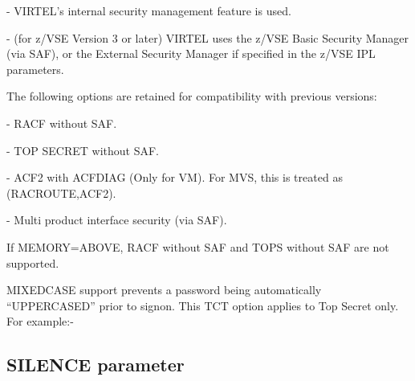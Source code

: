 \documentclass[letterpaper,10pt,english]{sphinxmanual}
\begin{document}
 - VIRTEL’s internal security management feature is used.

 - (for z/VSE Version 3 or later) VIRTEL uses the z/VSE Basic Security Manager (via SAF), or the External Security Manager if specified in the z/VSE IPL parameters.

The following options are retained for compatibility with previous versions:

 - RACF without SAF.

 - TOP SECRET without SAF.

 - ACF2 with ACFDIAG (Only for VM). For MVS, this is treated as (RACROUTE,ACF2).

 - Multi product interface security (via SAF).

If MEMORY=ABOVE, RACF without SAF and TOPS without SAF are not supported.

\newpage

MIXEDCASE support prevents a password being automatically “UPPERCASED” prior to signon. This TCT option applies to Top Secret only. For example:-

\begin{sphinxVerbatim}[commandchars=\\\{\}]
         


       
\end{sphinxVerbatim}

\ignorespaces 

\subsection{SILENCE parameter}
\label{\detokenize{Installation_Guide:silence-parameter}}\label{\detokenize{Installation_Guide:index-113}}
\begin{sphinxVerbatim}[commandchars=\\\{\}]
 
\end{sphinxVerbatim}
\end{document}
